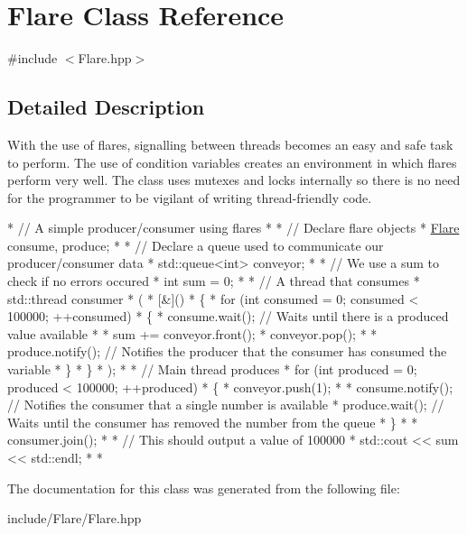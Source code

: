 \hypertarget{class_flare}{\section{Flare Class Reference}
\label{class_flare}
}


{\ttfamily \#include $<$Flare.\-hpp$>$}



\subsection{Detailed Description}
With the use of flares, signalling between threads becomes an easy and safe task to perform. The use of condition variables creates an environment in which flares perform very well. The class uses mutexes and locks internally so there is no need for the programmer to be vigilant of writing thread-\/friendly code.


\begin{DoxyCode}
*  \textcolor{comment}{// A simple producer/consumer using flares}
* 
*  \textcolor{comment}{// Declare flare objects}
*  \hyperlink{class_flare}{Flare} consume, produce;
* 
*  \textcolor{comment}{// Declare a queue used to communicate our producer/consumer data}
*  std::queue<int> conveyor;
* 
*  \textcolor{comment}{// We use a sum to check if no errors occured}
*  \textcolor{keywordtype}{int} sum = 0;
* 
*  \textcolor{comment}{// A thread that consumes}
*  std::thread consumer
*  (
*      [&]()
*      \{
*          \textcolor{keywordflow}{for} (\textcolor{keywordtype}{int} consumed = 0; consumed < 100000; ++consumed)
*          \{
*              consume.wait(); \textcolor{comment}{// Waits until there is a produced value available}
* 
*              sum += conveyor.front();
*              conveyor.pop();
* 
*              produce.notify(); \textcolor{comment}{// Notifies the producer that the consumer has consumed the variable}
*          \}
*      \}
*  );
* 
*  \textcolor{comment}{// Main thread produces}
*  \textcolor{keywordflow}{for} (\textcolor{keywordtype}{int} produced = 0; produced < 100000; ++produced)
*  \{
*      conveyor.push(1);
* 
*      consume.notify(); \textcolor{comment}{// Notifies the consumer that a single number is available}
*      produce.wait(); \textcolor{comment}{// Waits until the consumer has removed the number from the queue}
*  \}
* 
*  consumer.join();
* 
*  \textcolor{comment}{// This should output a value of 100000}
*  std::cout << sum << std::endl;
* 
*  
\end{DoxyCode}
 

The documentation for this class was generated from the following file\-:\begin{DoxyCompactItemize}
\item 
include/\-Flare/Flare.\-hpp\end{DoxyCompactItemize}
